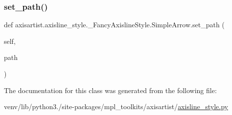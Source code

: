 \subsubsection{\texorpdfstring{set\+\_\+path()}{set\_path()}}
{\footnotesize\ttfamily def axisartist.\+axisline\+\_\+style.\+\_\+\+Fancy\+Axisline\+Style.\+Simple\+Arrow.\+set\+\_\+path (\begin{DoxyParamCaption}\item[{}]{self,  }\item[{}]{path }\end{DoxyParamCaption})}



The documentation for this class was generated from the following file\+:\begin{DoxyCompactItemize}
\item 
venv/lib/python3./site-\/packages/mpl\+\_\+toolkits/axisartist/\hyperlink{axisartist_2axisline__style_8py}{axisline\+\_\+style.\+py}\end{DoxyCompactItemize}

